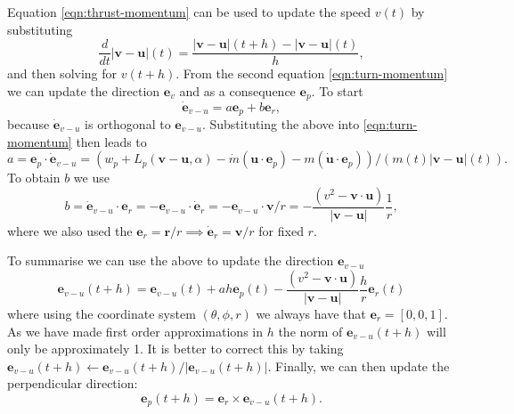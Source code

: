 \documentclass{article}
\renewcommand{\vec}[1]{\boldsymbol{#1}}
\begin{document}
Equation \eqref{eqn:thrust-momentum} can be used to update the speed $v(t)$ by substituting
\[
\frac{d}{dt} { |\vec{v}-\vec{u}|}(t) = \frac{{|\vec{v}-\vec{u}|}(t+h) - |\vec{v}-\vec{u}|(t)}{h},
\]
and then solving for ${v}(t+h)$. From the second equation \eqref{eqn:turn-momentum} we can update the direction $\vec {e}_v$ and as a consequence $\vec e_p$. To start
\[
\dot{\vec e}_{v-u} = a {\vec e}_p + b {\vec e}_r, 
\]
because $\dot {\vec e}_{v-u}$ is orthogonal to ${\vec e}_{v-u}$. Substituting the above into \eqref{eqn:turn-momentum} then leads to
\begin{equation}
 a =  {\vec{e}}_p \cdot \dot{\vec{e}}_{v-u} =  (w_p + L_p(\vec{v}-\vec{u},\alpha)  - \dot m (\vec{u} \cdot \vec{e}_{p})- m(\dot{\vec{u}}\cdot \vec{e}_{p} ) )/ (m(t) |\vec v-\vec u|(t)).
\end{equation}
To obtain $b$ we use 
\begin{equation}
b = \dot{\vec e}_{v-u} \cdot  {\vec e}_r = - {\vec e}_{v-u} \cdot  \dot {\vec e}_r =  - {\vec e}_{v-u} \cdot  {\vec v} / r = - \frac{(v^2-\vec v \cdot \vec{u})}{|\vec v-\vec u| } \frac{1}{r},    
\end{equation}
where we also used the $\vec e_r = \vec r / r \implies \dot{\vec e}_r = \vec v / r$ for fixed $r$.



 
To summarise we can use the above to update the direction $\vec e_{v-u}$
\begin{equation}
    \vec e_{v-u}(t+h) = \vec e_{v-u}(t) + a h \vec e_p(t) - \frac{(v^2-\vec v \cdot \vec{u})}{|\vec v-\vec u| } \frac{ h}{r} \vec e_r(t)
\end{equation}
where using the coordinate system $(\theta,\phi,r)$ we always have that $\vec e_r = [0,0,1]$. As we have made first order approximations in $h$ the norm of $\vec e_{v-u}(t+h)$ will only be approximately 1. It is better to correct this by taking $ \vec e_{v-u}(t+h)  \leftarrow  \vec e_{v-u}(t+h) / | \vec e_{v-u}(t+h) |$. Finally, we can then update the perpendicular direction:
\begin{equation}
    \vec e_p(t+h) = \vec e_r \times \vec e_{v-u}(t+h).
\end{equation}
\end{document}
